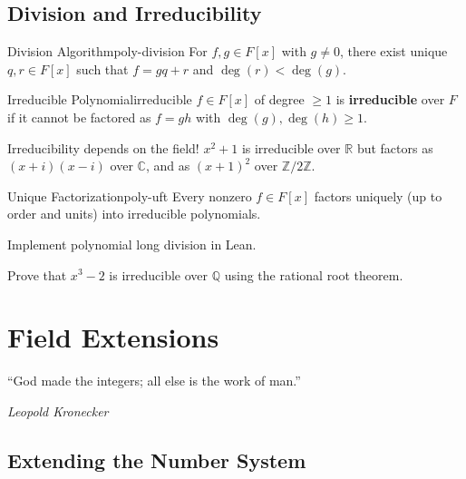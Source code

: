 \documentclass[11pt, a4paper, oneside]{book}
\newcommand{\Z}{\mathbb{Z}}
\newcommand{\Q}{\mathbb{Q}}
\newcommand{\R}{\mathbb{R}}
\newcommand{\C}{\mathbb{C}}
\renewcommand{\deg}{\operatorname{deg}}
\newcounter{exercise}[chapter]
\begin{document}
\section{Division and Irreducibility}

\begin{thm}{Division Algorithm}{poly-division}
For $f, g \in F[x]$ with $g \neq 0$, there exist unique $q, r \in F[x]$
such that $f = gq + r$ and $\deg(r) < \deg(g)$.
\end{thm}

\begin{defn}{Irreducible Polynomial}{irreducible}
$f \in F[x]$ of degree $\geq 1$ is \textbf{irreducible} over $F$ if it
cannot be factored as $f = gh$ with $\deg(g), \deg(h) \geq 1$.
\end{defn}

\begin{warning}
Irreducibility depends on the field! $x^2 + 1$ is irreducible over $\R$
but factors as $(x+i)(x-i)$ over $\C$, and as $(x+1)^2$ over $\Z/2\Z$.
\end{warning}

\begin{thm}{Unique Factorization}{poly-uft}
Every nonzero $f \in F[x]$ factors uniquely (up to order and units) into
irreducible polynomials.
\end{thm}

\begin{exercisebox}[title={Exercise 5.1}]
Implement polynomial long division in Lean.
\end{exercisebox}

\begin{exercisebox}[title={Exercise 5.2}]
Prove that $x^3 - 2$ is irreducible over $\Q$ using the rational root theorem.
\end{exercisebox}

\chapter{Field Extensions}

\epigraph{``God made the integers; all else is the work of man.''}%
{\textit{Leopold Kronecker}}

\section{Extending the Number System}
\end{document}
